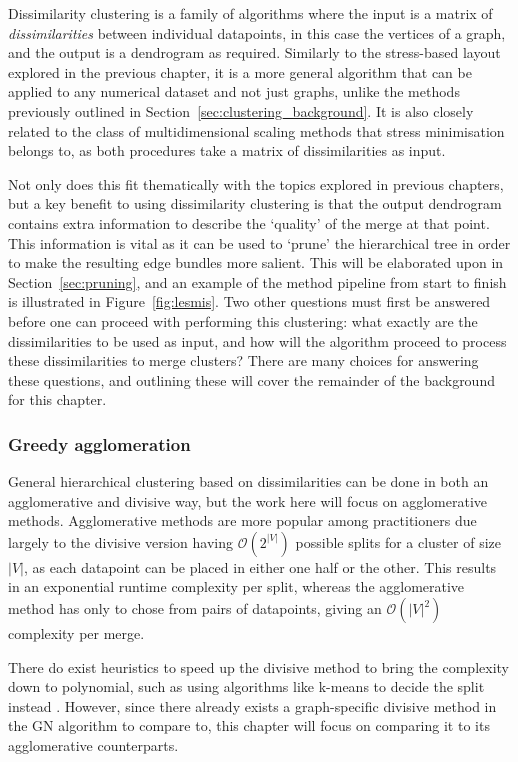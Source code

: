 Dissimilarity clustering is a family of algorithms where the input is a matrix of \emph{dissimilarities} between individual datapoints, in this case the vertices of a graph, and the output is a dendrogram as required. Similarly to the stress-based layout explored in the previous chapter, it is a more general algorithm that can be applied to any numerical dataset and not just graphs, unlike the methods previously outlined in Section~\ref{sec:clustering_background}. It is also closely related to the class of multidimensional scaling methods that stress minimisation belongs to, as both procedures take a matrix of dissimilarities as input.

Not only does this fit thematically with the topics explored in previous chapters, but a key benefit to using dissimilarity clustering is that the output dendrogram contains extra information to describe the `quality' of the merge at that point. This information is vital as it can be used to `prune' the hierarchical tree in order to make the resulting edge bundles more salient. This will be elaborated upon in Section~\ref{sec:pruning}, and an example of the method pipeline from start to finish is illustrated in Figure~\ref{fig:lesmis}.
Two other questions must first be answered before one can proceed with performing this clustering: what exactly are the dissimilarities to be used as input, and how will the algorithm proceed to process these dissimilarities to merge clusters? There are many choices for answering these questions, and outlining these will cover the remainder of the background for this chapter.

\subsubsection{Greedy agglomeration}
General hierarchical clustering based on dissimilarities can be done in both an agglomerative and divisive way, but the work here will focus on agglomerative methods. Agglomerative methods are more popular among practitioners \citep{Roux2018} due largely to the divisive version having $\mathcal{O}(2^{|V|})$ possible splits for a cluster of size $|V|$, as each datapoint can be placed in either one half or the other. This results in an exponential runtime complexity per split, whereas the agglomerative method has only to chose from pairs of datapoints, giving an $\mathcal{O}(|V|^2)$ complexity per merge.

There do exist heuristics to speed up the divisive method to bring the complexity down to polynomial, such as using algorithms like k-means to decide the split instead \citep{Lamrous2006}.
However, since there already exists a graph-specific divisive method in the GN algorithm to compare to, this chapter will focus on comparing it to its agglomerative counterparts.

